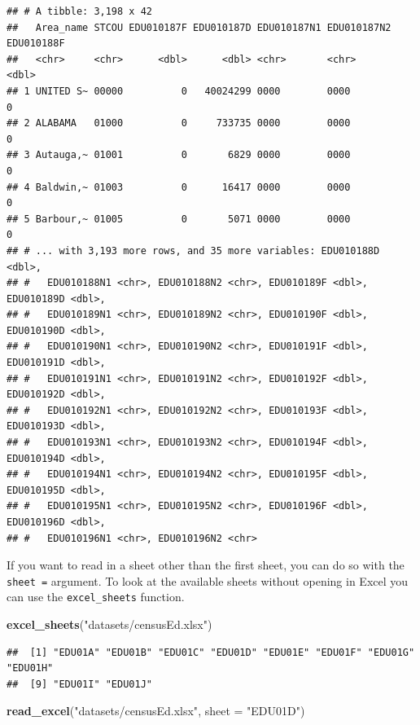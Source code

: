 \documentclass[
]{book}
\newenvironment{Shaded}{\begin{snugshade}}{\end{snugshade}}
\newcommand{\DataTypeTok}[1]{\textcolor[rgb]{0.13,0.29,0.53}{#1}}
\newcommand{\KeywordTok}[1]{\textcolor[rgb]{0.13,0.29,0.53}{\textbf{#1}}}
\newcommand{\NormalTok}[1]{#1}
\newcommand{\StringTok}[1]{\textcolor[rgb]{0.31,0.60,0.02}{#1}}
\theoremstyle{definition}
\theoremstyle{definition}
\theoremstyle{definition}
\theoremstyle{remark}
\begin{document}
\begin{verbatim}
## # A tibble: 3,198 x 42
##   Area_name STCOU EDU010187F EDU010187D EDU010187N1 EDU010187N2 EDU010188F
##   <chr>     <chr>      <dbl>      <dbl> <chr>       <chr>            <dbl>
## 1 UNITED S~ 00000          0   40024299 0000        0000                 0
## 2 ALABAMA   01000          0     733735 0000        0000                 0
## 3 Autauga,~ 01001          0       6829 0000        0000                 0
## 4 Baldwin,~ 01003          0      16417 0000        0000                 0
## 5 Barbour,~ 01005          0       5071 0000        0000                 0
## # ... with 3,193 more rows, and 35 more variables: EDU010188D <dbl>,
## #   EDU010188N1 <chr>, EDU010188N2 <chr>, EDU010189F <dbl>, EDU010189D <dbl>,
## #   EDU010189N1 <chr>, EDU010189N2 <chr>, EDU010190F <dbl>, EDU010190D <dbl>,
## #   EDU010190N1 <chr>, EDU010190N2 <chr>, EDU010191F <dbl>, EDU010191D <dbl>,
## #   EDU010191N1 <chr>, EDU010191N2 <chr>, EDU010192F <dbl>, EDU010192D <dbl>,
## #   EDU010192N1 <chr>, EDU010192N2 <chr>, EDU010193F <dbl>, EDU010193D <dbl>,
## #   EDU010193N1 <chr>, EDU010193N2 <chr>, EDU010194F <dbl>, EDU010194D <dbl>,
## #   EDU010194N1 <chr>, EDU010194N2 <chr>, EDU010195F <dbl>, EDU010195D <dbl>,
## #   EDU010195N1 <chr>, EDU010195N2 <chr>, EDU010196F <dbl>, EDU010196D <dbl>,
## #   EDU010196N1 <chr>, EDU010196N2 <chr>
\end{verbatim}

If you want to read in a sheet other than the first sheet, you can do so with the \texttt{sheet\ =} argument. To look at the available sheets without opening in Excel you can use the \texttt{excel\_sheets} function.

\begin{Shaded}
\begin{Highlighting}[]
\KeywordTok{excel_sheets}\NormalTok{(}\StringTok{"datasets/censusEd.xlsx"}\NormalTok{)}
\end{Highlighting}
\end{Shaded}

\begin{verbatim}
##  [1] "EDU01A" "EDU01B" "EDU01C" "EDU01D" "EDU01E" "EDU01F" "EDU01G" "EDU01H"
##  [9] "EDU01I" "EDU01J"
\end{verbatim}

\begin{Shaded}
\begin{Highlighting}[]
\KeywordTok{read_excel}\NormalTok{(}\StringTok{"datasets/censusEd.xlsx"}\NormalTok{, }\DataTypeTok{sheet =} \StringTok{"EDU01D"}\NormalTok{)}
\end{Highlighting}
\end{Shaded}
\end{document}
